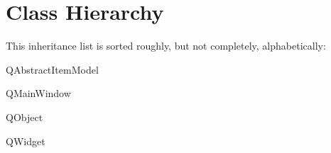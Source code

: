 \section{Class Hierarchy}
This inheritance list is sorted roughly, but not completely, alphabetically\-:\begin{DoxyCompactList}
\item Q\-Abstract\-Item\-Model\begin{DoxyCompactList}
\item {}
\end{DoxyCompactList}
\item Q\-Main\-Window\begin{DoxyCompactList}
\item {}
\end{DoxyCompactList}
\item Q\-Object\begin{DoxyCompactList}
\item {}
\item {}
\end{DoxyCompactList}
\item Q\-Widget\begin{DoxyCompactList}
\item {}
\begin{DoxyCompactList}
\item {}
\end{DoxyCompactList}
\item {}
\begin{DoxyCompactList}
\item {}
\end{DoxyCompactList}
\item {}
\begin{DoxyCompactList}
\item {}
\end{DoxyCompactList}
\end{DoxyCompactList}
\end{DoxyCompactList}
